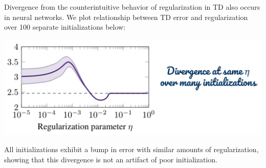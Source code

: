 Divergence from the counterintuitive behavior of regularization in TD also occurs in neural networks. We plot relationship between TD error and regularization over 100 separate initializations below:
\begin{center}
    \hspace*{1in}
    \includegraphics[scale=0.4]{parts/nn/nn.png}
\end{center}
All initializations exhibit a bump in error with similar amounts of regularization, showing that this divergence is not an artifact of poor initialization.
